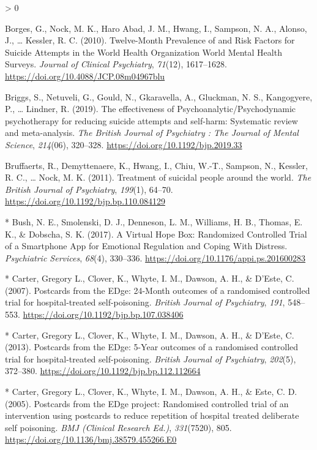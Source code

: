 \documentclass[
  english,
  man]{apa6}
\newlength{\cslhangindent}
\newenvironment{CSLReferences}[2] %
 {%
  \setlength{\parindent}{0pt}
  \ifodd #1 \everypar{\setlength{\hangindent}{\cslhangindent}}\ignorespaces\fi
  \ifnum #2 > 0
  \setlength{\parskip}{#2\baselineskip}
  \fi
 }%
 {}
\begin{document}
\begin{CSLReferences}{1}{0}
\leavevmode\hypertarget{ref-borges2010}{}%
Borges, G., Nock, M. K., Haro Abad, J. M., Hwang, I., Sampson, N. A., Alonso, J., \ldots{} Kessler, R. C. (2010). Twelve-{Month Prevalence} of and {Risk Factors} for {Suicide Attempts} in the {World Health Organization World Mental Health Surveys}. \emph{Journal of Clinical Psychiatry}, \emph{71}(12), 1617--1628. \url{https://doi.org/10.4088/JCP.08m04967blu}

\leavevmode\hypertarget{ref-briggs2019}{}%
Briggs, S., Netuveli, G., Gould, N., Gkaravella, A., Gluckman, N. S., Kangogyere, P., \ldots{} Lindner, R. (2019). The effectiveness of {Psychoanalytic}/{Psychodynamic} psychotherapy for reducing suicide attempts and self-harm: Systematic review and meta-analysis. \emph{The British Journal of Psychiatry : The Journal of Mental Science}, \emph{214}(06), 320--328. \url{https://doi.org/10.1192/bjp.2019.33}

\leavevmode\hypertarget{ref-bruffaerts2011}{}%
Bruffaerts, R., Demyttenaere, K., Hwang, I., Chiu, W.-T., Sampson, N., Kessler, R. C., \ldots{} Nock, M. K. (2011). Treatment of suicidal people around the world. \emph{The British Journal of Psychiatry}, \emph{199}(1), 64--70. \url{https://doi.org/10.1192/bjp.bp.110.084129}

\leavevmode\hypertarget{ref-bush2017}{}%
* Bush, N. E., Smolenski, D. J., Denneson, L. M., Williams, H. B., Thomas, E. K., \& Dobscha, S. K. (2017). A {Virtual Hope Box}: Randomized {Controlled Trial} of a {Smartphone App} for {Emotional Regulation} and {Coping With Distress}. \emph{Psychiatric Services}, \emph{68}(4), 330--336. \url{https://doi.org/10.1176/appi.ps.201600283}

\leavevmode\hypertarget{ref-carter2007}{}%
* Carter, Gregory L., Clover, K., Whyte, I. M., Dawson, A. H., \& D'Este, C. (2007). Postcards from the {EDge}: 24-{Month} outcomes of a randomised controlled trial for hospital-treated self-poisoning. \emph{British Journal of Psychiatry}, \emph{191}, 548--553. \url{https://doi.org/10.1192/bjp.bp.107.038406}

\leavevmode\hypertarget{ref-carter2013}{}%
* Carter, Gregory L., Clover, K., Whyte, I. M., Dawson, A. H., \& D'Este, C. (2013). Postcards from the {EDge}: 5-{Year} outcomes of a randomised controlled trial for hospital-treated self-poisoning. \emph{British Journal of Psychiatry}, \emph{202}(5), 372--380. \url{https://doi.org/10.1192/bjp.bp.112.112664}

\leavevmode\hypertarget{ref-carter2005}{}%
* Carter, Gregory L., Clover, K., Whyte, I. M., Dawson, A. H., \& Este, C. D. (2005). Postcards from the {EDge} project: Randomised controlled trial of an intervention using postcards to reduce repetition of hospital treated deliberate self poisoning. \emph{BMJ (Clinical Research Ed.)}, \emph{331}(7520), 805. \url{https://doi.org/10.1136/bmj.38579.455266.E0}


\end{CSLReferences}
\end{document}
